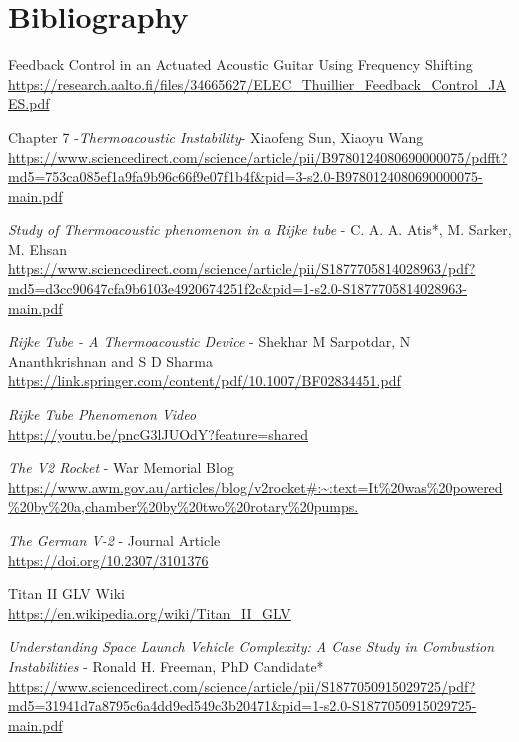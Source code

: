 \documentclass[8pt]{article} %
\begin{document}
\newpage
\section{Bibliography}
\begin{thebibliography}{99}

Feedback Control in an Actuated Acoustic Guitar Using Frequency Shifting\\ \url{https://research.aalto.fi/files/34665627/ELEC_Thuillier_Feedback_Control_JAES.pdf}

Chapter 7 -\emph{Thermoacoustic Instability}- Xiaofeng Sun, Xiaoyu Wang\\ \url{https://www.sciencedirect.com/science/article/pii/B9780124080690000075/pdfft?md5=753ca085ef1a9fa9b96c66f9e07f1b4f&pid=3-s2.0-B9780124080690000075-main.pdf}

\emph{Study of Thermoacoustic phenomenon in a Rijke tube} - C. A. A. Atis*, M. Sarker, M. Ehsan\\ \url{https://www.sciencedirect.com/science/article/pii/S1877705814028963/pdf?md5=d3cc90647cfa9b6103e4920674251f2c&pid=1-s2.0-S1877705814028963-main.pdf}

\emph{Rijke Tube - A Thermoacoustic Device} - Shekhar M Sarpotdar, N Ananthkrishnan and S D Sharma\\ \url{https://link.springer.com/content/pdf/10.1007/BF02834451.pdf}

\emph{Rijke Tube Phenomenon Video}\\ \url{https://youtu.be/pncG3lJUOdY?feature=shared}

\emph{The V2 Rocket} - War Memorial Blog\\ \url{https://www.awm.gov.au/articles/blog/v2rocket#:~:text=It%
}

\emph{The German V-2} - Journal Article\\ \url{https://doi.org/10.2307/3101376}

Titan II GLV Wiki\\ \url{https://en.wikipedia.org/wiki/Titan_II_GLV}

\emph{Understanding Space Launch Vehicle Complexity: A Case Study in Combustion Instabilities} - Ronald H. Freeman, PhD Candidate*\\ \url{https://www.sciencedirect.com/science/article/pii/S1877050915029725/pdf?md5=31941d7a8795c6a4dd9ed549c3b20471&pid=1-s2.0-S1877050915029725-main.pdf}


\end{thebibliography}
\end{document}
